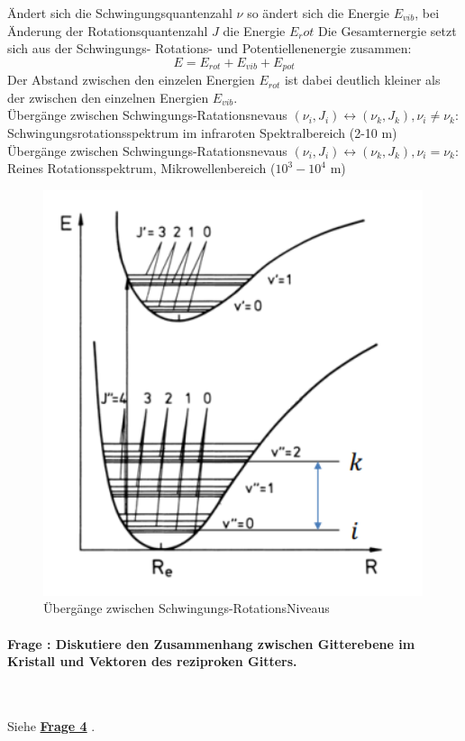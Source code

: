 \documentclass[a4paper, 11pt, ngerman, parskip=half-]{scrartcl}
\newcounter{question}
\newcommand{\question}[1]{\stepcounter{question}\paragraph{Frage \thequestion: #1}~}
\newcommand{\aqref}[1]{%
  \phantomsection\label{q:#1}%
  \textbf{\hyperref[q:#1]{Frage #1}}%
}
\begin{document}
Ändert sich die Schwingungsquantenzahl $\nu$ so ändert sich die Energie $E_{vib}$, bei Änderung der Rotationsquantenzahl $J$ die Energie $E_rot$ Die Gesamternergie setzt sich aus der Schwingungs- Rotations- und Potentiellenenergie zusammen:
\begin{equation}
    E = E_{rot} + E_{vib} + E_{pot}
\end{equation}
Der Abstand zwischen den einzelen Energien $E_{rot}$ ist dabei deutlich kleiner als der zwischen den einzelnen Energien $E_{vib}$.\\
Übergänge zwischen Schwingungs-Ratationsnevaus $(\nu_i, J_i) \longleftrightarrow (\nu_k, J_k), \nu_i \neq \nu_k$: Schwingungsrotationsspektrum im infraroten Spektralbereich (2-10 \textmu m)\\
Übergänge zwischen Schwingungs-Ratationsnevaus $(\nu_i, J_i) \longleftrightarrow (\nu_k, J_k), \nu_i = \nu_k$: Reines Rotationsspektrum, Mikrowellenbereich ($10^3-10^4$ \textmu m)
\begin{figure}[h!]
    \centering
    \includegraphics{resources/05-05-2015/Frage_14.png}
    \caption{Übergänge zwischen Schwingungs-RotationsNiveaus}
    \label{fig:enter-label}
\end{figure}

\question{Diskutiere den Zusammenhang zwischen Gitterebene im Kristall und Vektoren des reziproken Gitters.}
\label{q:15}

Siehe \aqref{4}.
\end{document}
